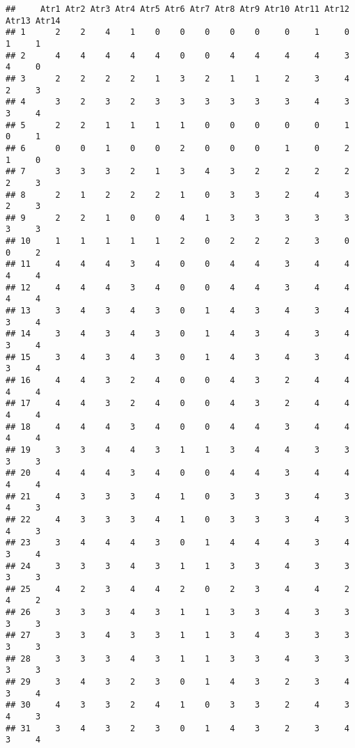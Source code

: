 \documentclass[
]{article}
\begin{document}
\begin{verbatim}
##     Atr1 Atr2 Atr3 Atr4 Atr5 Atr6 Atr7 Atr8 Atr9 Atr10 Atr11 Atr12 Atr13 Atr14
## 1      2    2    4    1    0    0    0    0    0     0     1     0     1     1
## 2      4    4    4    4    4    0    0    4    4     4     4     3     4     0
## 3      2    2    2    2    1    3    2    1    1     2     3     4     2     3
## 4      3    2    3    2    3    3    3    3    3     3     4     3     3     4
## 5      2    2    1    1    1    1    0    0    0     0     0     1     0     1
## 6      0    0    1    0    0    2    0    0    0     1     0     2     1     0
## 7      3    3    3    2    1    3    4    3    2     2     2     2     2     3
## 8      2    1    2    2    2    1    0    3    3     2     4     3     2     3
## 9      2    2    1    0    0    4    1    3    3     3     3     3     3     3
## 10     1    1    1    1    1    2    0    2    2     2     3     0     0     2
## 11     4    4    4    3    4    0    0    4    4     3     4     4     4     4
## 12     4    4    4    3    4    0    0    4    4     3     4     4     4     4
## 13     3    4    3    4    3    0    1    4    3     4     3     4     3     4
## 14     3    4    3    4    3    0    1    4    3     4     3     4     3     4
## 15     3    4    3    4    3    0    1    4    3     4     3     4     3     4
## 16     4    4    3    2    4    0    0    4    3     2     4     4     4     4
## 17     4    4    3    2    4    0    0    4    3     2     4     4     4     4
## 18     4    4    4    3    4    0    0    4    4     3     4     4     4     4
## 19     3    3    4    4    3    1    1    3    4     4     3     3     3     3
## 20     4    4    4    3    4    0    0    4    4     3     4     4     4     4
## 21     4    3    3    3    4    1    0    3    3     3     4     3     4     3
## 22     4    3    3    3    4    1    0    3    3     3     4     3     4     3
## 23     3    4    4    4    3    0    1    4    4     4     3     4     3     4
## 24     3    3    3    4    3    1    1    3    3     4     3     3     3     3
## 25     4    2    3    4    4    2    0    2    3     4     4     2     4     2
## 26     3    3    3    4    3    1    1    3    3     4     3     3     3     3
## 27     3    3    4    3    3    1    1    3    4     3     3     3     3     3
## 28     3    3    3    4    3    1    1    3    3     4     3     3     3     3
## 29     3    4    3    2    3    0    1    4    3     2     3     4     3     4
## 30     4    3    3    2    4    1    0    3    3     2     4     3     4     3
## 31     3    4    3    2    3    0    1    4    3     2     3     4     3     4

\end{verbatim}
\end{document}
